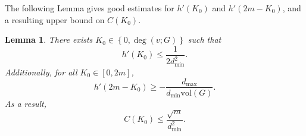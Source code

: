 \documentclass[11pt,twoside]{article}
\newtheorem{lemma}{Lemma}
\newcommand{\set}[1]{\left\{#1\right\}}
\newcommand{\vol}{\mathrm{vol}}
\newcommand{\1}{\mathbf{1}}
\begin{document}
The following Lemma gives good estimates for $h'(K_0)$ and $h'(2m - K_0)$, and a resulting upper bound on $C(K_0)$.
\begin{lemma}
	\label{lem:linearization_bound}
	There exists $K_0 \in \set{0,\deg(v;G)}$ such that
	\begin{equation}
	\label{eqn:left_derivative}
	h'(K_0) \leq  \frac{1}{2d_{\min}^2}.
	\end{equation}
	Additionally, for all $K_0 \in [0,2m]$,
	\begin{equation}
	\label{eqn:right_derivative}
	h'(2m - K_0) \geq -\frac{d_{\max}}{d_{\min}\vol(G)}.
	\end{equation}
	As a result,
	\begin{equation*}
	C(K_0) \leq \frac{\sqrt{m}}{d_{\min}^2}.
	\end{equation*}
\end{lemma}
\end{document}
